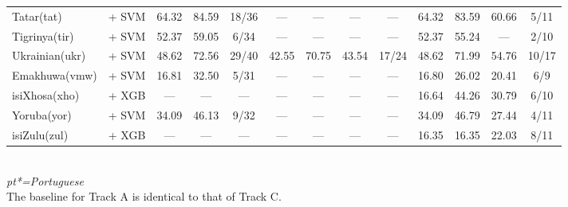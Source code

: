 \begin{table*}[h]
{\begin{tabular}{l|c|ccc|cccc|cccc}
            Tatar(tat)           & \citep{wang2024multilingual}    + SVM                                  & 64.32                        & 84.59                        & 18/36                       & —             & —             & —                 & —             & 64.32         & 83.59         & 60.66             & 5/11          \\
            Tigrinya(tir)        & \citep{wang2024multilingual}    + SVM                                  & 52.37                        & 59.05                        & 6/34                        & —             & —             & —                 & —             & 52.37         & 55.24         & —                 & 2/10          \\
            Ukrainian(ukr)       & \citep{sturua2024jinaembeddingsv3multilingualembeddingstask}   + SVM   & 48.62                        & 72.56                        & 29/40                       & 42.55         & 70.75         & 43.54             & 17/24         & 48.62         & 71.99         & 54.76             & 10/17         \\
            Emakhuwa(vmw)        & \citep{sturua2024jinaembeddingsv3multilingualembeddingstask}   + SVM   & 16.81                        & 32.50                        & 5/31                        & —             & —             & —                 & —             & 16.80         & 26.02         & 20.41             & 6/9           \\
            isiXhosa(xho)        & \citep{wang2024multilingual}     + XGB                                 & —                            & —                            & —                           & —             & —             & —                 & —             & 16.64         & 44.26         & 30.79             & 6/10          \\
            Yoruba(yor)          & \citep{wang2024multilingual}     + SVM                                 & 34.09                        & 46.13                        & 9/32                        & —             & —             & —                 & —             & 34.09         & 46.79         & 27.44             & 4/11          \\
            isiZulu(zul)         & \citep{wang2024multilingual}     + XGB                                 & —                            & —                            & —                           & —             & —             & —                 & —             & 16.35         & 16.35         & 22.03             & 8/11          \\
            \hline
        \end{tabular}
    }
    \\
    \footnotesize{\textit{pt*=Portuguese}}
    \\
    \footnotesize{The baseline for Track A is identical to that of Track C.}
\end{table*}